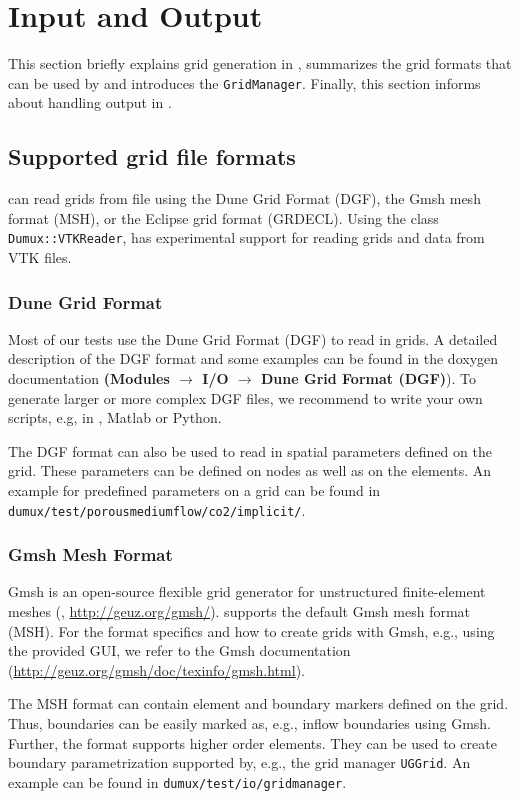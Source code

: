 \section{Input and Output}
\label{sec:inputandoutput}

This section briefly explains grid generation in \Dumux, summarizes
the grid formats that can be used by \Dumux and introduces the \Dumux \texttt{GridManager}.
Finally, this section informs about handling output in \Dumux.

\subsection{Supported grid file formats}
\Dumux can read grids from file using the Dune Grid Format (DGF), the Gmsh mesh format (MSH), or the Eclipse grid format (GRDECL).
Using the class \texttt{Dumux::VTKReader}, \Dumux has experimental support for reading grids and data from VTK files.

\subsubsection{Dune Grid Format}
Most of our \Dumux tests use the Dune Grid Format (DGF) to read in grids. A detailed description
of the DGF format and some examples can be found in the \Dune doxygen documentation
\textbf{(Modules $\rightarrow$ I/O $\rightarrow$ Dune Grid Format (DGF)}). To generate larger or more
complex DGF files, we recommend to write your own scripts, e.g, in \Cplusplus, Matlab or Python.

The DGF format can also be used to read in spatial parameters defined on the grid. These parameters can
be defined on nodes as well as on the elements. An example for predefined parameters on a grid
can be found in \texttt{dumux/test/porousmediumflow/co2/implicit/}.

\subsubsection{Gmsh Mesh Format}
Gmsh is an open-source flexible grid generator for unstructured finite-element meshes (\cite{GEUZAINE2009}, \url{http://geuz.org/gmsh/}).
\Dumux supports the default Gmsh mesh format (MSH). For the format specifics and how to create grids with Gmsh, e.g., using
the provided GUI, we refer to the Gmsh documentation (\url{http://geuz.org/gmsh/doc/texinfo/gmsh.html}).

The MSH format can contain element and boundary markers defined on the grid. Thus, boundaries can be easily marked as, e.g., inflow boundaries
using Gmsh. Further, the format supports higher order elements. They can be used to create boundary parametrization supported by, e.g., the grid
manager \texttt{UGGrid}.
An example can be found in \texttt{dumux/test\allowbreak/io/gridmanager}.

